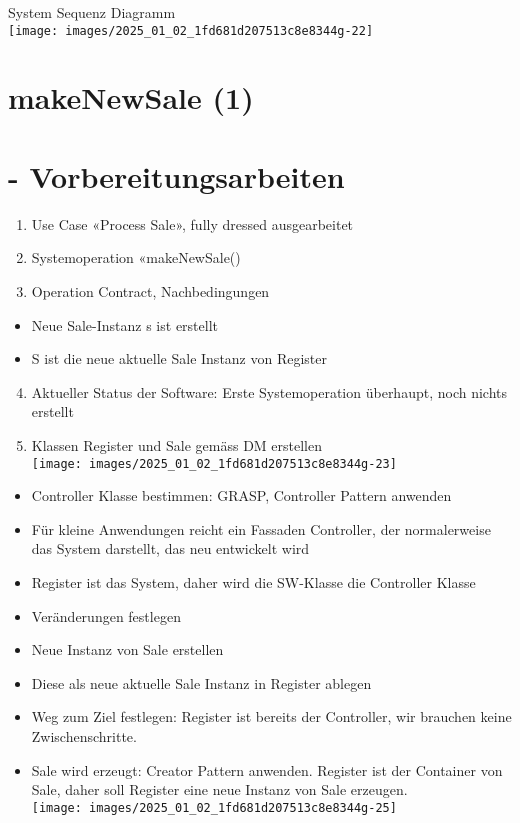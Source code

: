 \documentclass[10pt]{article}
\begin{document}
System Sequenz Diagramm\\
\texttt{[image: images/2025\_01\_02\_1fd681d207513c8e8344g-22]}

\section*{makeNewSale (1)}
\section*{- Vorbereitungsarbeiten}
\begin{enumerate}
  \item Use Case «Process Sale», fully dressed ausgearbeitet
  \item Systemoperation «makeNewSale()
  \item Operation Contract, Nachbedingungen
\end{enumerate}

\begin{itemize}
  \item Neue Sale-Instanz s ist erstellt
  \item S ist die neue aktuelle Sale Instanz von Register
\end{itemize}

\begin{enumerate}
  \setcounter{enumi}{3}
  \item Aktueller Status der Software: Erste Systemoperation überhaupt, noch nichts erstellt
  \item Klassen Register und Sale gemäss DM erstellen\\
\texttt{[image: images/2025\_01\_02\_1fd681d207513c8e8344g-23]}
\end{enumerate}

\begin{itemize}
  \item Controller Klasse bestimmen: GRASP, Controller Pattern anwenden
  \item Für kleine Anwendungen reicht ein Fassaden Controller, der normalerweise das System darstellt, das neu entwickelt wird
  \item Register ist das System, daher wird die SW-Klasse die Controller Klasse
  \item Veränderungen festlegen
  \item Neue Instanz von Sale erstellen
  \item Diese als neue aktuelle Sale Instanz in Register ablegen
  \item Weg zum Ziel festlegen: Register ist bereits der Controller, wir brauchen keine Zwischenschritte.
  \item Sale wird erzeugt: Creator Pattern anwenden. Register ist der Container von Sale, daher soll Register eine neue Instanz von Sale erzeugen.\\
\texttt{[image: images/2025\_01\_02\_1fd681d207513c8e8344g-25]}
\end{itemize}
\end{document}
